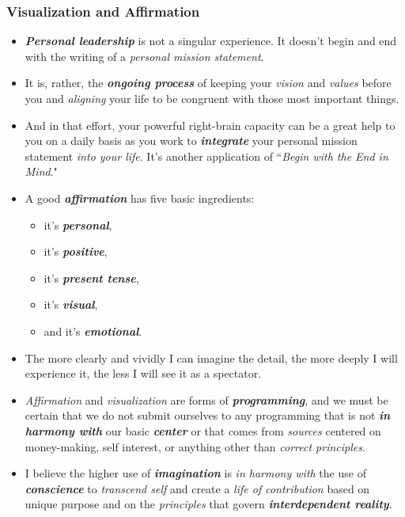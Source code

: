 \documentclass[11pt]{article}
\begin{document}
\subsubsection{Visualization and Affirmation}
\begin{itemize}
\item \emph{\textbf{Personal leadership}} is not a singular experience. It doesn't begin and end with the writing of a \emph{personal mission statement}. 

\item It is, rather, the \emph{\textbf{ongoing process}} of keeping your \emph{vision} and \emph{values} before you and \emph{aligning} your life to be congruent with those most important things.

\item And in that effort, your powerful right-brain capacity can be a great help to you on a daily basis as you work to \emph{\textbf{integrate}} your personal mission statement \emph{into your life}. It's another application of ``\emph{Begin with the End in Mind}."

\item A good \textbf{\emph{affirmation}} has five basic ingredients:
\begin{itemize}
\item  it's \emph{\textbf{personal}},
\item  it's \emph{\textbf{positive}},
\item  it's \emph{\textbf{present tense}},
\item  it's \emph{\textbf{visual}}, 
\item and it's \emph{\textbf{emotional}}. 
\end{itemize}

\item The more clearly and vividly I can imagine the detail, the more deeply I will experience it, the less I will see it as a spectator.

\item \emph{Affirmation} and \emph{visualization} are forms of \emph{\textbf{programming}}, and we must be certain that we do not submit ourselves to any programming that is not \emph{\textbf{in harmony with}} our basic \emph{\textbf{center}} or that comes from \emph{sources} centered on money-making, self interest, or anything other than \emph{correct principles}.

\item  I believe the higher use of \emph{\textbf{imagination}} is \emph{in harmony with} the use of \emph{\textbf{conscience}} to \emph{transcend self} and create a \emph{life of contribution} based on unique purpose and on the \emph{principles} that govern \emph{\textbf{interdependent reality}}.
\end{itemize}
\end{document}
